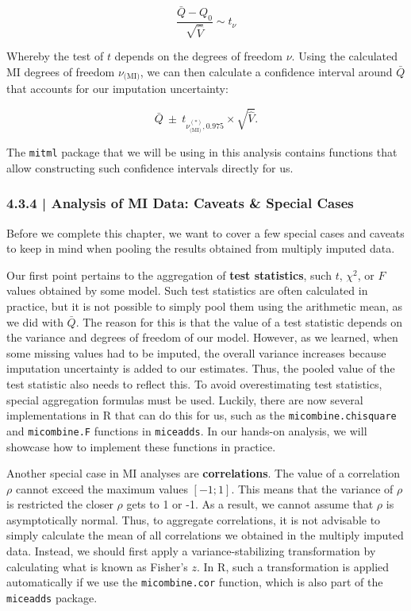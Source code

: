 \begin{equation}
\frac{\bar{Q}-Q_0}{\sqrt{\hat{V}}} \sim t_\nu
\end{equation}

Whereby the test of $t$ depends on the degrees of freedom $\nu$. Using the calculated MI degrees of freedom $\nu_{\text{(MI)}}$, we can then calculate a confidence interval around $\bar Q$ that accounts for our imputation uncertainty:

\begin{equation}
\bar{Q}~\pm~t_{\nu^{(*)}_{\text{(MI)}}, \text{0.975}} \times \sqrt{\hat{V}}.
\end{equation}

The \texttt{mitml} package that we will be using in this analysis contains functions that allow constructing such confidence intervals directly for us. 


\subsubsection{{\normalfont\textsf{\textcolor{sBlue}{\small 4.3.4 |}}} Analysis of MI Data: Caveats \& Special Cases }

Before we complete this chapter, we want to cover a few special cases and caveats to keep in mind when pooling the results obtained from multiply imputed data. 

Our first point pertains to the aggregation of \textbf{test statistics}, such $t$, $\chi^2$, or $F$ values obtained by some model. Such test statistics are often calculated in practice, but it is not possible to simply pool them using the arithmetic mean, as we did with $\bar Q$. The reason for this is that the value of a test statistic depends on the variance and degrees of freedom of our model. However, as we learned, when some missing values had to be imputed, the overall variance increases because imputation uncertainty is added to our estimates. Thus, the pooled value of the test statistic also needs to reflect this. To avoid overestimating test statistics, special aggregation formulas must be used. Luckily, there are now several implementations in \textsf{R} that can do this for us, such as the \texttt{micombine.chisquare} and \texttt{micombine.F} functions in \texttt{miceadds}. In our hands-on analysis, we will showcase how to implement these functions in practice.

Another special case in MI analyses are \textbf{correlations}. The value of a correlation $\rho$ cannot exceed the maximum values $[-1;1]$. This means that the variance of $\rho$ is restricted the closer $\rho$ gets to 1 or -1. As a result, we cannot assume that $\rho$ is asymptotically normal. Thus, to aggregate correlations, it is not advisable to simply calculate the mean of all correlations we obtained in the multiply imputed data. Instead, we should first apply a variance-stabilizing transformation by calculating what is known as Fisher's $z$. In \textsf{R}, such a transformation is applied automatically if we use the \texttt{micombine.cor} function, which is also part of the \texttt{miceadds} package.

